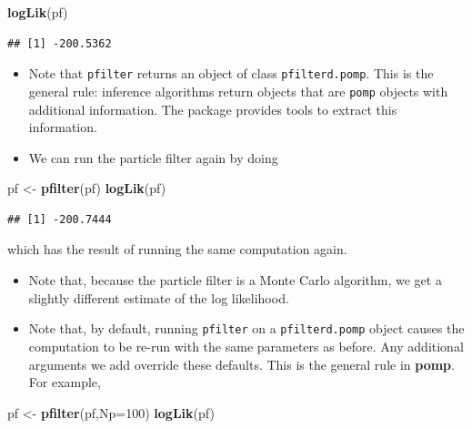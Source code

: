 \documentclass[]{article}
\newenvironment{Shaded}{\begin{snugshade}}{\end{snugshade}}
\newcommand{\KeywordTok}[1]{\textcolor[rgb]{0.13,0.29,0.53}{\textbf{#1}}}
\newcommand{\DataTypeTok}[1]{\textcolor[rgb]{0.13,0.29,0.53}{#1}}
\newcommand{\DecValTok}[1]{\textcolor[rgb]{0.00,0.00,0.81}{#1}}
\newcommand{\StringTok}[1]{\textcolor[rgb]{0.31,0.60,0.02}{#1}}
\newcommand{\NormalTok}[1]{#1}
\begin{document}

\begin{Shaded}
\begin{Highlighting}[]
\KeywordTok{logLik}\NormalTok{(pf)}
\end{Highlighting}
\end{Shaded}

\begin{verbatim}
## [1] -200.5362
\end{verbatim}

\begin{itemize}
\item
  Note that \texttt{pfilter} returns an object of class
  \texttt{pfilterd.pomp}. This is the general rule: inference algorithms
  return objects that are \texttt{pomp} objects with additional
  information. The package provides tools to extract this information.
\item
  We can run the particle filter again by doing
\end{itemize}

\begin{Shaded}
\begin{Highlighting}[]
\NormalTok{pf <-}\StringTok{ }\KeywordTok{pfilter}\NormalTok{(pf)}
\KeywordTok{logLik}\NormalTok{(pf)}
\end{Highlighting}
\end{Shaded}

\begin{verbatim}
## [1] -200.7444
\end{verbatim}

which has the result of running the same computation again.

\begin{itemize}
\item
  Note that, because the particle filter is a Monte Carlo algorithm, we
  get a slightly different estimate of the log likelihood.
\item
  Note that, by default, running \texttt{pfilter} on a
  \texttt{pfilterd.pomp} object causes the computation to be re-run with
  the same parameters as before. Any additional arguments we add
  override these defaults. This is the general rule in \textbf{pomp}.
  For example,
\end{itemize}

\begin{Shaded}
\begin{Highlighting}[]
\NormalTok{pf <-}\StringTok{ }\KeywordTok{pfilter}\NormalTok{(pf,}\DataTypeTok{Np=}\DecValTok{100}\NormalTok{)}
\KeywordTok{logLik}\NormalTok{(pf)}
\end{Highlighting}
\end{Shaded}
\end{document}
